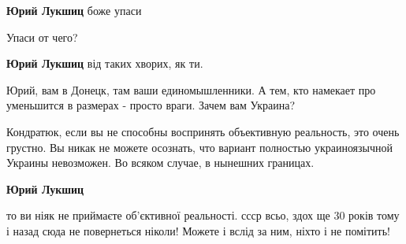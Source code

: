 \begin{itemize}
\begin{itemize}
 

\textbf{Юрий Лукшиц} боже упаси

 
Упаси от чего?

 
\textbf{Юрий Лукшиц} від таких хворих, як ти.

 
Юрий, вам в Донецк, там ваши единомышленники. А тем, кто намекает про
уменьшится в размерах - просто враги. Зачем вам Украина?


 

Кондратюк, если вы не способны воспринять объективную реальность, это очень
грустно. Вы никак не можете осознать, что вариант полностью украиноязычной
Украины невозможен. Во всяком случае, в нынешних границах.

 
\textbf{Юрий Лукшиц} 

то ви ніяк не приймаєте об'єктивної реальності. ссср всьо, здох ще 30 років
тому і назад сюда не повернеться ніколи! Можете і вслід за ним, ніхто і не
помітить!


 


\end{itemize}
\end{itemize}
